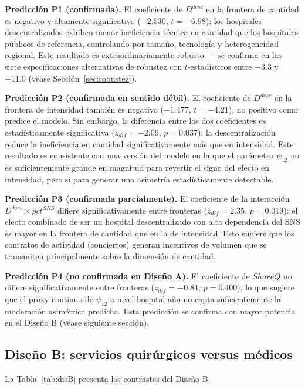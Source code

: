 \documentclass[12pt, a4paper]{article}
\begin{document}
\textbf{Predicción P1 (confirmada).} El coeficiente de
$D^{desc}$ en la frontera de cantidad es negativo y
altamente significativo ($-2.530$, $t=-6.98$): los
hospitales descentralizados exhiben menor ineficiencia
técnica en cantidad que los hospitales públicos de
referencia, controlando por tamaño, tecnología y
heterogeneidad regional. Este resultado es extraordinariamente
robusto --- se confirma en las siete especificaciones
alternativas de robustez con $t$-estadísticos entre
$-3.3$ y $-11.0$ (véase Sección~\ref{sec:robustez}).

\textbf{Predicción P2 (confirmada en sentido débil).}
El coeficiente de $D^{desc}$ en la frontera de
intensidad también es negativo ($-1.477$, $t=-4.21$),
no positivo como predice el modelo. Sin embargo, la
diferencia entre los dos coeficientes es
estadísticamente significativa ($z_{dif}=-2.09$,
$p=0.037$): la descentralización reduce la ineficiencia
en cantidad significativamente más que en intensidad.
Este resultado es consistente con una versión del modelo
en la que el parámetro $\psi_{12}$ no es suficientemente
grande en magnitud para revertir el signo del efecto
en intensidad, pero sí para generar una asimetría
estadísticamente detectable.

\textbf{Predicción P3 (confirmada parcialmente).}
El coeficiente de la interacción $D^{desc} \times
pct^{SNS}$ difiere significativamente entre fronteras
($z_{dif}=2.35$, $p=0.019$): el efecto combinado de ser
un hospital descentralizado con alta dependencia del SNS
es mayor en la frontera de cantidad que en la de
intensidad. Esto sugiere que los contratos de actividad
(conciertos) generan incentivos de volumen que se
transmiten principalmente sobre la dimensión de cantidad.

\textbf{Predicción P4 (no confirmada en Diseño A).}
El coeficiente de $ShareQ$ no difiere
significativamente entre fronteras ($z_{dif}=-0.84$,
$p=0.400$), lo que sugiere que el proxy continuo de
$\psi_{12}$ a nivel hospital-año no capta
suficientemente la moderación asimétrica predicha. Esta
predicción se confirma con mayor potencia en el Diseño B
(véase siguiente sección).

\subsection{Diseño B: servicios quirúrgicos versus médicos}

La Tabla~\ref{tab:disB} presenta los contrastes del
Diseño B.
\end{document}
